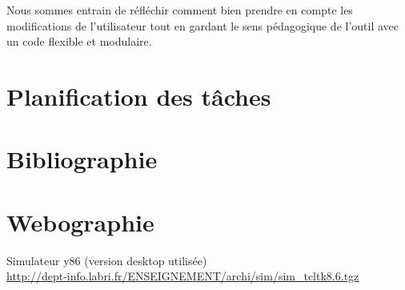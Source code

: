 \documentclass[french]{article}
\begin{document}
Nous sommes entrain de réfléchir comment bien prendre en compte les modifications de l'utilisateur tout en gardant le sens pédagogique de l'outil avec un code flexible et modulaire.

\section{Planification des tâches}

\section{Bibliographie}

\section{Webographie}

Simulateur y86 (version desktop utilisée) \\
\url{http://dept-info.labri.fr/ENSEIGNEMENT/archi/sim/sim_tcltk8.6.tgz}
\end{document}
